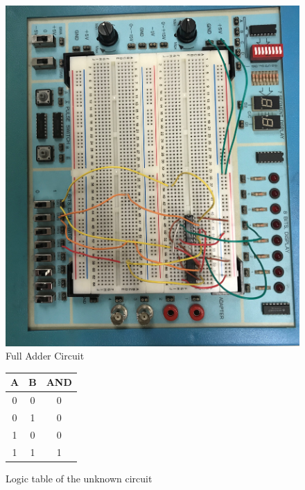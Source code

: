 \documentclass[11pt]{article}
\begin{document}
\begin{figure}
\includegraphics[width=1.0\textwidth]{"FUULADDER"}
\caption{Full Adder Circuit}
\end{figure}
\begin{figure}[ht]\centering
	\begin{tabular}{cc|c}
		\toprule
		A & B & AND \\
		\midrule
		0 & 0 & 0 \\
		0 & 1 & 0 \\
		1 & 0 & 0 \\
		1 & 1 & 1 \\
		\bottomrule
	\end{tabular} 
	
	\caption{Logic table of the unknown circuit}
	
\end{figure}
\end{document}
